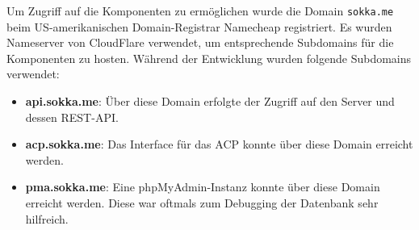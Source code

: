 Um Zugriff auf die Komponenten zu ermöglichen wurde die Domain \lstinline{sokka.me} beim US-amerikanischen Domain-Registrar Namecheap registriert. Es wurden Nameserver von CloudFlare verwendet, um entsprechende Subdomains für die Komponenten zu hosten. Während der Entwicklung wurden folgende Subdomains verwendet:

\begin{itemize}
    \item \textbf{api.sokka.me}: Über diese Domain erfolgte der Zugriff auf den Server und dessen REST-API.
    \item \textbf{acp.sokka.me}: Das Interface für das ACP konnte über diese Domain erreicht werden.
    \item \textbf{pma.sokka.me}: Eine phpMyAdmin-Instanz konnte über diese Domain erreicht werden. Diese war oftmals zum Debugging der Datenbank sehr hilfreich.
\end{itemize}
